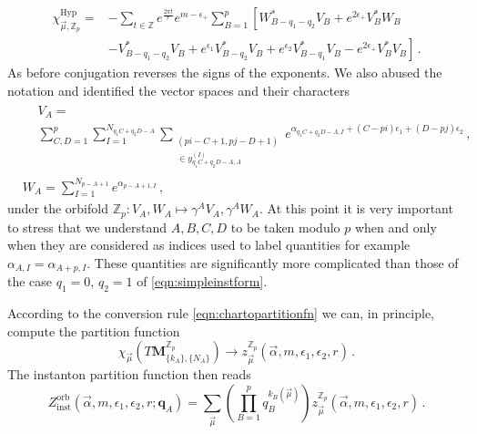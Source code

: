 \documentclass[main.tex]{subfiles}
\begin{document}
\begin{equation}
\begin{aligned}
\chi_{\vec{\mu},\mathbb{Z}_p}^{\text{Hyp}}=&-\sum_{t\in\mathbb{Z}}e^{\frac{2\pi t}{r}}e^{m-\epsilon_+}
\sum_{B=1}^p\left[W^*_{B-q_1-q_2}V_B+e^{2\epsilon_+}V^*_{B}W_B\right.\\
&\left.-V_{B-q_1-q_2}^*V_{B}+e^{\epsilon_1}V_{B-q_2}^*V_{B}+e^{\epsilon_2}V_{B-q_1}^*V_{B}-e^{2\epsilon_+}V_{B}^*V_{B}\right]\,.
\end{aligned}
\end{equation}
As before conjugation reverses the signs of the exponents. We also abused the notation and identified the vector spaces and their characters
\begin{align}
&\begin{aligned}
&V_A=\\
&\sum_{C,D=1}^p\sum_{I=1}^{N_{q_{1}C+q_{2}D-A}}\sum_{\substack{(pi-C+1,pj-D+1)\\\in y_{q_{1}C+q_{2}D-A,A}^{(I)}}}e^{\alpha_{q_{1}C+q_{2}D-A,I}+(C-pi)\epsilon_1+(D-pj)\epsilon_2}\,,
\end{aligned}\\
&W_A=\sum_{I=1}^{N_{p-A+1}}e^{\alpha_{p-A+1,I}}\,,
\end{align}
under the orbifold $\mathbb{Z}_p:V_A,W_A\mapsto \gamma^AV_A,\gamma^AW_A$. At this point it is very important to stress that we understand $A,B,C,D$ to be taken modulo $p$ when and only when they are considered as indices used to label quantities for example $\alpha_{A,I}=\alpha_{A+p,I}$. These quantities are significantly more complicated than those of the case $q_1=0$, $q_2=1$ of \eqref{eqn:simpleinstform}.

According to the conversion rule \eqref{eqn:chartopartitionfn} we can, in principle, compute the partition function
\begin{equation}
\chi_{\vec{\mu}}\left(T\mathbf{M}_{\{k_A\},\{N_A\}}^{\mathbb{Z}_p}\right)\to z^{\mathbb{Z}_p}_{\vec{\mu}}\left(\vec{\alpha},m,\epsilon_1,\epsilon_2,r\right)\,.
\end{equation}
The instanton partition function then reads
\begin{equation}
Z_{\text{inst}}^{\text{orb}}\left(\vec{\alpha},m,\epsilon_1,\epsilon_2,r;\mathbf{q}_A\right)=\sum_{\vec{\mu}}\left(\prod_{B=1}^pq_B^{k_B(\vec{\mu})}\right)z^{\mathbb{Z}_p}_{\vec{\mu}}\left(\vec{\alpha},m,\epsilon_1,\epsilon_2,r\right)\,.
\end{equation}
\end{document}
